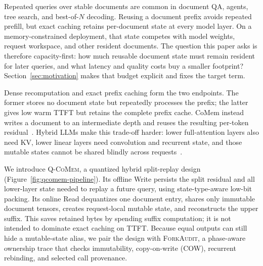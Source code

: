 \documentclass{article}
\newcommand{\qcomem}{\textsc{Q-CoMem}}
\newcommand{\method}{\textsc{ForkAudit}}
\begin{document}
Repeated queries over stable documents are common in document QA, agents, tree
search, and best-of-$N$ decoding.  Reusing a document prefix avoids repeated
prefill, but exact caching retains per-document state at every model layer.  On
a memory-constrained deployment, that state competes with model weights,
request workspace, and other resident documents.  The question this paper asks
is therefore capacity-first: how much reusable document state must remain
resident for later queries, and what latency and quality costs buy a smaller
footprint?  Section~\ref{sec:motivation} makes that budget explicit and fixes
the target term.

Dense recomputation and exact prefix caching form the two endpoints.  The former
stores no document state but repeatedly processes the prefix; the latter gives
low warm TTFT but retains the complete prefix cache.  CoMem instead writes a
document to an intermediate depth and reuses the resulting per-token
residual~\citep{liu2026comem,liu2026understanding}.  Hybrid LLMs make this
trade-off harder: lower full-attention layers also need KV, lower linear layers
need convolution and recurrent state, and those mutable states cannot be shared
blindly across requests~\citep{yang2025gateddeltanet,lieber2025jamba}.

We introduce \qcomem{}, a quantized hybrid split-replay design
(Figure~\ref{fig:qcomem-pipeline}).  Its offline Write persists the split
residual and all lower-layer state needed to replay a future query, using
state-type-aware low-bit packing.  Its online Read dequantizes one document
entry, shares only immutable document tensors, creates request-local mutable
state, and reconstructs the upper suffix.  This saves retained bytes by spending
suffix computation; it is not intended to dominate exact caching on TTFT.
Because equal outputs can still hide a mutable-state alias, we pair the design
with \method{}, a phase-aware ownership trace that checks immutability,
copy-on-write (COW), recurrent rebinding, and selected call provenance.
\end{document}
